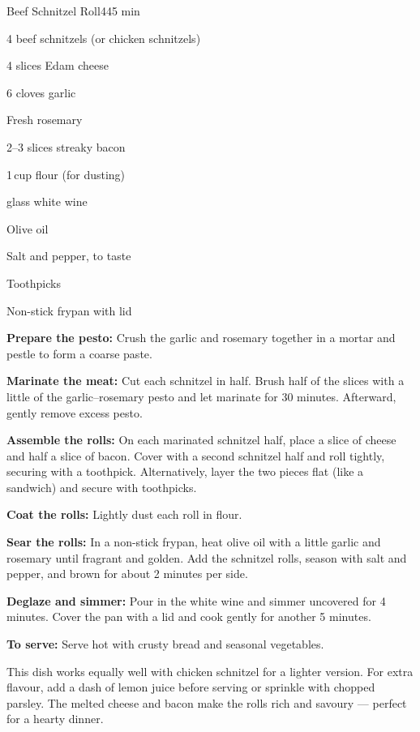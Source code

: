 \begin{recipebox}{Beef Schnitzel Roll}{4}{45 min}
  \begin{ingredients}
    \item 4 beef schnitzels (or chicken schnitzels)
    \item 4 slices Edam cheese
    \item 6 cloves garlic
    \item Fresh rosemary
    \item 2--3 slices streaky bacon
    \item 1\,cup flour (for dusting)
    \item {} glass white wine
    \item Olive oil
    \item Salt and pepper, to taste
    \item Toothpicks
    \item Non-stick frypan with lid
  \end{ingredients}

  \begin{method}
    \item \textbf{Prepare the pesto:} Crush the garlic and rosemary together in a mortar and pestle to form a coarse paste.
    \item \textbf{Marinate the meat:} Cut each schnitzel in half. Brush half of the slices with a little of the garlic–rosemary pesto and let marinate for 30 minutes. Afterward, gently remove excess pesto.
    \item \textbf{Assemble the rolls:} On each marinated schnitzel half, place a slice of cheese and half a slice of bacon. Cover with a second schnitzel half and roll tightly, securing with a toothpick.  
    Alternatively, layer the two pieces flat (like a sandwich) and secure with toothpicks.
    \item \textbf{Coat the rolls:} Lightly dust each roll in flour.
    \item \textbf{Sear the rolls:} In a non-stick frypan, heat olive oil with a little garlic and rosemary until fragrant and golden. Add the schnitzel rolls, season with salt and pepper, and brown for about 2 minutes per side.
    \item \textbf{Deglaze and simmer:} Pour in the white wine and simmer uncovered for 4 minutes. Cover the pan with a lid and cook gently for another 5 minutes.
    \item \textbf{To serve:} Serve hot with crusty bread and seasonal vegetables.
  \end{method}

  \begin{notes}
    This dish works equally well with chicken schnitzel for a lighter version.  
    For extra flavour, add a dash of lemon juice before serving or sprinkle with chopped parsley.  
    The melted cheese and bacon make the rolls rich and savoury — perfect for a hearty dinner.
  \end{notes}
\end{recipebox}
